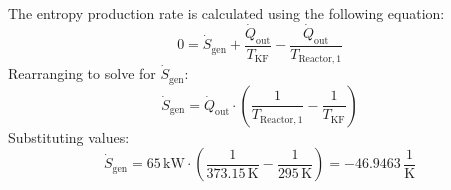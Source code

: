 The entropy production rate is calculated using the following equation:  
\[
0 = \dot{S}_{\text{gen}} + \frac{\dot{Q}_{\text{out}}}{T_{\text{KF}}} - \frac{\dot{Q}_{\text{out}}}{T_{\text{Reactor},1}}
\]  
Rearranging to solve for \( \dot{S}_{\text{gen}} \):  
\[
\dot{S}_{\text{gen}} = \dot{Q}_{\text{out}} \cdot \left( \frac{1}{T_{\text{Reactor},1}} - \frac{1}{T_{\text{KF}}} \right)
\]  
Substituting values:  
\[
\dot{S}_{\text{gen}} = 65 \, \text{kW} \cdot \left( \frac{1}{373.15 \, \text{K}} - \frac{1}{295 \, \text{K}} \right) = -46.9463 \, \frac{\text{1}}{\text{K}}
\]